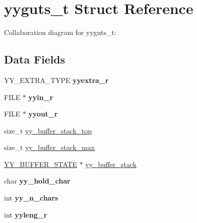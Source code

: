 \hypertarget{structyyguts__t}{}\section{yyguts\+\_\+t Struct Reference}
\label{structyyguts__t}


Collaboration diagram for yyguts\+\_\+t\+:
\subsection*{Data Fields}
\begin{DoxyCompactItemize}
\item 
\mbox{\label{structyyguts__t_a9f6feb2c222f0294d5d1de3a9e8cdd7b}} 
Y\+Y\+\_\+\+E\+X\+T\+R\+A\+\_\+\+T\+Y\+PE {\bfseries yyextra\+\_\+r}
\item 
\mbox{\label{structyyguts__t_af4d5f8f7ca6f895861709dde5c10f6c3}} 
F\+I\+LE $\ast$ {\bfseries yyin\+\_\+r}
\item 
\mbox{\label{structyyguts__t_a1576f8f959b4083f3c9d615ee7f5bca7}} 
F\+I\+LE $\ast$ {\bfseries yyout\+\_\+r}
\item 
size\+\_\+t \hyperlink{structyyguts__t_ae54779a12769204c826899d0531e40e6}{yy\+\_\+buffer\+\_\+stack\+\_\+top}
\item 
size\+\_\+t \hyperlink{structyyguts__t_a437cdcd878686881404e320fd941929c}{yy\+\_\+buffer\+\_\+stack\+\_\+max}
\item 
\hyperlink{structyy__buffer__state}{Y\+Y\+\_\+\+B\+U\+F\+F\+E\+R\+\_\+\+S\+T\+A\+TE} $\ast$ \hyperlink{structyyguts__t_a34b6ab3a3061471b6604dba48e47a101}{yy\+\_\+buffer\+\_\+stack}
\item 
\mbox{\label{structyyguts__t_a13f78e763996d2d86c85b45cbe146282}} 
char {\bfseries yy\+\_\+hold\+\_\+char}
\item 
\mbox{\label{structyyguts__t_aa86c122f2050dbfd365fcf547e6fc1c3}} 
int {\bfseries yy\+\_\+n\+\_\+chars}
\item 
\mbox{\label{structyyguts__t_a68b5dbc7fa11de3740d144c812edcd44}} 
int {\bfseries yyleng\+\_\+r}
\item 
\mbox{\label{structyyguts__t_ade8fc57d3529bff56440a4f3e9c29586}} 

\end{DoxyCompactItemize}
